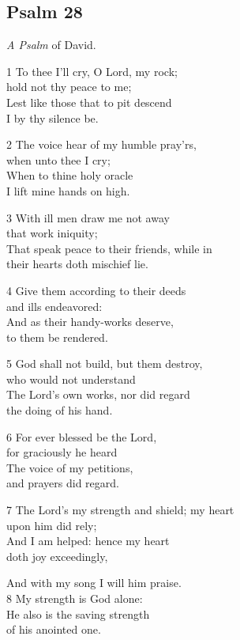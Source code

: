 \subsection*{Psalm 28 }

\emph{A Psalm} of David.

1 To thee I’ll cry, O Lord, my rock;\\
hold not thy peace to me;\\
Lest like those that to pit descend\\
I by thy silence be.

2 The voice hear of my humble pray’rs,\\
when unto thee I cry;\\
When to thine holy oracle\\
I lift mine hands on high.

3 With ill men draw me not away\\
that work iniquity;\\
That speak peace to their friends, while in\\
their hearts doth mischief lie.

4 Give them according to their deeds\\
and ills endeavored:\\
And as their handy-works deserve,\\
to them be rendered.

5 God shall not build, but them destroy,\\
who would not understand\\
The Lord’s own works, nor did regard\\
the doing of his hand.

6 For ever blessed be the Lord,\\
for graciously he heard\\
The voice of my petitions,\\
and prayers did regard.

7 The Lord’s my strength and shield; my heart\\
upon him did rely;\\
And I am helped: hence my heart\\
doth joy exceedingly,

And with my song I will him praise.\\
8 My strength is God alone:\\
He also is the saving strength\\
of his anointed one.\\

